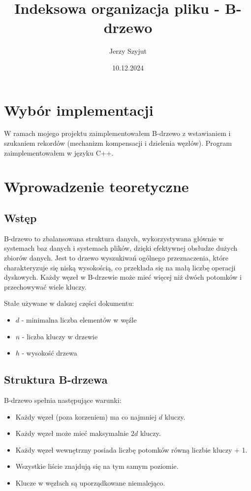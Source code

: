 \documentclass{article}
\title{Indeksowa organizacja pliku - B-drzewo}
\author{Jerzy Szyjut}
\date{10.12.2024}
\begin{document}
\maketitle

\section{Wybór implementacji}
W ramach mojego projektu zaimplementowałem B-drzewo z wstawianiem i szukaniem rekordów (mechanizm kompensacji i dzielenia węzłów). Program zaimplementowałem w języku C++. 


\section{Wprowadzenie teoretyczne}
\subsection{Wstęp}

B-drzewo to zbalansowana struktura danych, wykorzystywana głównie w systemach baz danych i systemach plików, dzięki efektywnej obsłudze dużych zbiorów danych. Jest to drzewo wyszukiwań ogólnego przeznaczenia, które charakteryzuje się niską wysokością, co przekłada się na małą liczbę operacji dyskowych. Każdy węzeł w B-drzewie może mieć więcej niż dwóch potomków i przechowywać wiele kluczy.

Stałe używane w dalszej części dokumentu:
\begin{itemize}
    \item $d$ - minimalna liczba elementów w węźle
    \item $n$ - liczba kluczy w drzewie
    \item $h$ - wysokość drzewa
\end{itemize}

\subsection{Struktura B-drzewa}
B-drzewo spełnia następujące warunki:
\begin{itemize}
    \item Każdy węzeł (poza korzeniem) ma co najmniej $d$ kluczy.
    \item Każdy węzeł może mieć maksymalnie $2d$ kluczy.
    \item Każdy węzeł wewnętrzny posiada liczbę potomków równą liczbie kluczy + 1.
    \item Wszystkie liście znajdują się na tym samym poziomie.
    \item Klucze w węzłach są uporządkowane niemalejąco.
\end{itemize}
\end{document}

